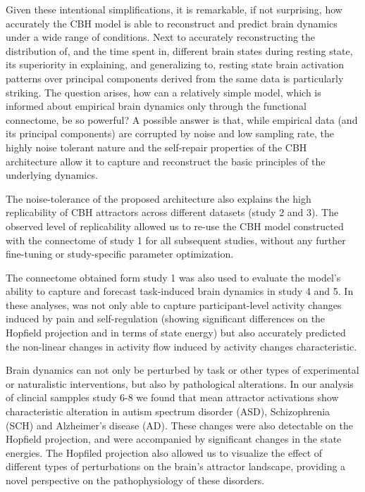 \documentclass{article}
\begin{document}
Given these intentional simplifications, it is remarkable, if not surprising, how accurately the CBH model is able to reconstruct and predict brain dynamics under a wide range of conditions. Next to accurately reconstructing the distribution of, and the time spent in, different brain states during resting state, its superiority in explaining, and generalizing to, resting state brain activation patterns over principal components derived from the same data is particularly striking.
The question arises, how can a relatively simple model, which is informed about empirical brain dynamics only through the functional connectome, be so powerful?
A possible answer is that, while empirical data (and its principal components) are corrupted by noise and low sampling rate,
the highly noise tolerant nature and the self-repair properties of the CBH architecture allow it to capture and reconstruct the basic principles of the underlying dynamics.

The noise-tolerance of the proposed architecture also explains the high replicability of CBH attractors across different datasets (study 2 and 3).
The observed level of replicability allowed us to re-use the CBH model constructed with the connectome of study 1 for all subsequent studies, without any further fine-tuning or study-specific parameter optimization.

The connectome obtained form study 1 was also used to evaluate the model's ability to capture and forecast task-induced brain dynamics in study 4 and 5. In these analyses, was not only able to capture participant-level activity changes induced by pain and self-regulation (showing significant differences on the Hopfield projection and in terms of state energy) but also accurately predicted the non-linear changes in activity flow induced by activity changes characteristic.

Brain dynamics can not only be perturbed by task or other types of experimental or naturalistic interventions, but also by pathological alterations.
In our analysis of clincial sampples study 6-8 we found that mean attractor activations show characteristic alteration in autism spectrum disorder (ASD), Schizophrenia (SCH) and Alzheimer's disease (AD). These changes were also detectable on the Hopfield projection, and were accompanied by significant changes in the state energies.
The Hopfiled projection also allowed us to visualize the effect of different types of perturbations on the brain's attractor landscape, providing a novel perspective on the pathophysiology of these disorders.
\end{document}
